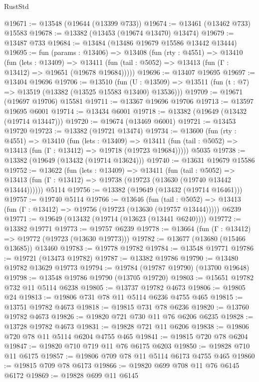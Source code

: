 \begin{lexlean}{RustStd}
\begin{coremodule}
@19671 := @13548 (@19644 (@13399 @733))
@19674 := @13461 (@13462 @733) @15583
@19678 := @13382 (@13453 (@19674 @13470) @13474)
@19679 := @13487 @733
@19684 := @13484 (@13486 @19679 @15586 @13442 @13444)
@19695 := fun (params : @13406) =>
  @13408
    (fun (rty : @4551) =>
    @13410
      (fun (lets : @13409) =>
      @13411 (fun (tail : @5052) => @13413 (fun (Γ : @13412) => @19651 (@19678 @19684)))))
@19696 := @13407 @19695
@19697 := @13404 @19696
@19706 := @13510
    (fun (U : @13509) => @13511 (fun (t : @7) => @13519 (@13382 (@13525 @15583 @13400) @13536)))
@19709 := @19671 (@19697 @19706) @15581
@19711 := @13367 @19696 @19706
@19713 := @13597 @19695 @6001
@19714 := @13434 @6001
@19718 := @13382 (@19649 (@13432 (@19714 @13447)))
@19720 := @19674 (@13469 @6001)
@19721 := @13453 @19720
@19723 := @13382 (@19721 @13474)
@19734 := @13600
    (fun (rty : @4551) =>
    @13410
      (fun (lets : @13409) =>
      @13411 (fun (tail : @5052) => @13413 (fun (Γ : @13412) => @19718 (@19723 @19684)))))
    @5035
@19738 := @13382 (@19649 (@13432 (@19714 @13624)))
@19740 := @13631 @19679 @15586
@19752 := @13622
    (fun (lets : @13409) =>
    @13411
      (fun (tail : @5052) =>
      @13413 (fun (Γ : @13412) => @19738 (@19723 (@13630 (@19740 @13442 @13444))))))
    @5114
@19756 := @13382 (@19649 (@13432 (@19714 @16461)))
@19757 := @19740 @5114
@19766 := @13646
    (fun (tail : @5052) => @13413 (fun (Γ : @13412) => @19756 (@19723 (@13630 (@19757 @13444)))))
    @6239
@19771 := @19649 (@13432 (@19714 (@13623 (@13441 @6240))))
@19772 := @13382 @19771
@19773 := @19757 @6239
@19778 := @13664 (fun (Γ : @13412) => @19772 (@19723 (@13630 @19773)))
@19782 := @13677 (@13680 (@15466 @13685)) @13460
@19783 := @19778 @19782
@19784 := @13548 @19771
@19786 := @19721 (@13473 @19782)
@19787 := @13382 @19786
@19790 := @13480 @19782 @13629 @19773
@19794 := @19784 (@19787 @19790) (@13700 @19648)
@19798 := @13548 @19786 @19790 (@13705 @19720)
@19803 := @15651 @19782 @732 @11 @5114 @6238
@19805 := @13737 @19782 @4673
@19806 := @19805 @24
@19813 := @19806 @731 @78 @11 @5114 @6236 @4755 @465
@19815 := @13751 @19782 @4673
@19818 := @19815 @731 @78 @6236
@19820 := @13760 @19782 @4673
@19826 := @19820 @721 @730 @11 @76 @6206 @6235
@19828 := @13728 @19782 @4673
@19831 := @19828 @721 @11 @6206
@19838 := @19806 @720 @78 @11 @5114 @6204 @4755 @465
@19841 := @19815 @720 @78 @6204
@19847 := @19820 @710 @719 @11 @76 @6175 @6203
@19850 := @19828 @710 @11 @6175
@19857 := @19806 @709 @78 @11 @5114 @6173 @4755 @465
@19860 := @19815 @709 @78 @6173
@19866 := @19820 @699 @708 @11 @76 @6145 @6172
@19869 := @19828 @699 @11 @6145

\end{coremodule}
\end{lexlean}
